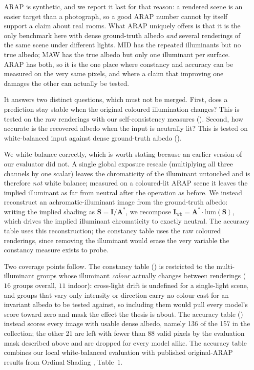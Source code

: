 ARAP  is synthetic, and we report it last for that reason: a rendered
scene is an easier target than a photograph, so a good ARAP number cannot by itself
support a claim about real rooms.
What ARAP uniquely offers is that it is the only benchmark here with dense
ground-truth albedo \emph{and} several renderings of the same scene under different
lights. MID has the repeated illuminants but no true albedo; MAW has the true albedo
but only one illuminant per surface. ARAP has both, so it is the one place where
constancy and accuracy can be measured on the very same pixels, and where a claim
that improving one damages the other can actually be tested.

It answers two distinct questions, which must not be merged.
First, does a prediction stay stable when the original coloured illumination changes?
This is tested on the raw renderings with our self-consistency measures
().
Second, how accurate is the recovered albedo when the input is neutrally lit?
This is tested on white-balanced input against dense ground-truth albedo
().

We white-balance correctly, which is worth stating because an earlier version of our
evaluator did not. A single global exposure rescale (multiplying all three channels by
one scalar) leaves the chromaticity of the illuminant untouched and is therefore
\emph{not} white balance; measured on a coloured-lit ARAP scene it leaves the implied
illuminant as far from neutral after the operation as before. We instead reconstruct an
achromatic-illuminant image from the ground-truth albedo: writing the implied shading as
$\mathbf{S}=\mathbf{I}/\mathbf{A}^{*}$, we recompose $\mathbf{I}_{\text{wb}} =
\mathbf{A}^{*}\cdot\mathrm{lum}(\mathbf{S})$, which drives the implied illuminant chromaticity
to exactly neutral. The accuracy table uses this reconstruction; the constancy table uses the
raw coloured renderings, since removing the illuminant would erase the very variable the
constancy measure exists to probe.

Two coverage points follow. The constancy table
() is restricted to the multi-illuminant groups whose illuminant
\emph{colour} actually changes between renderings ($16$ groups overall, $11$ indoor): cross-light
drift is undefined for a single-light scene, and groups that vary only intensity or direction
carry no colour cast for an invariant albedo to be tested against, so including them would pull
every model's score toward zero and mask the effect the thesis is about. The accuracy table
() instead scores every image with usable dense albedo, namely 136 of
the 157 in the collection; the other 21 are left with fewer than 88 valid pixels by the
evaluation mask described above and are dropped for every model alike. The accuracy
table combines our local white-balanced evaluation with published original-ARAP
results from Ordinal Shading , Table~1.

